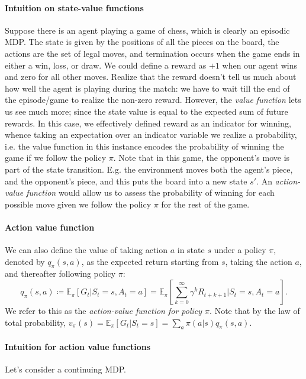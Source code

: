 \documentclass[12pt]{article}
\begin{document}
\paragraph{Intuition on state-value functions} Suppose there is an agent playing a game of chess, which is clearly an episodic MDP. The state is given by the positions of all the pieces on the board, the actions are the set of legal moves, and termination occurs when the game ends in either a win, loss, or draw. We could define a reward as $+1$ when our agent wins and zero for all other moves. Realize that the reward doesn't tell us much about how well the agent is playing during the match: we have to wait till the end of the episode/game to realize the non-zero reward. However, the \emph{value function} lets us see much more; since the state value is equal to the expected sum of future rewards. In this case, we effectively defined reward as an indicator for winning, whence taking an expectation over an indicator variable we realize a probability, i.e. the value function in this instance encodes the probability of winning the game if we follow the policy $\pi$. Note that in this game, the opponent's move is part of the state transition. E.g. the environment moves both the agent's piece, and the opponent's piece, and this puts the board into a new state $s'$. An \emph{action-value function} would allow us to assess the probability of winning for each possible move given we follow the policy $\pi$ for the rest of the game.

\paragraph{Action value function}
We can also define the value of taking action $a$ in state $s$ under a policy $\pi$, denoted by $q_\pi(s,a)$, as the expected return starting from $s$, taking the action $a$, and thereafter following policy $\pi$:
\begin{equation}
  \label{eq: actionvaluepolicyforpi}
  q_\pi(s,a) \coloneqq \mathbb E_\pi \left[G_t | S_t = s, A_t = a \right] = \mathbb E_\pi \left[ \sum_{k=0}^\infty \gamma^k R_{t+k+1} | S_t = s , A_t = a \right].
\end{equation}
We refer to this as the \emph{action-value function for policy $\pi$}. Note that by the law of total probability, $v_\pi(s) = \mathbb E_\pi \left[G_t | S_t =       s\right] = \sum_{a} \pi(a|s) q_\pi(s,a)$.

\paragraph{Intuition for action value functions} Let's consider a continuing MDP.
\end{document}
